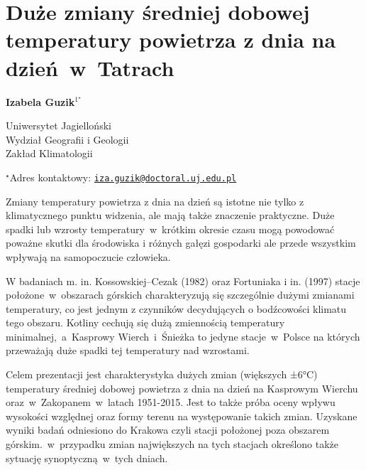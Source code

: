 \documentclass[\main/boa.tex]{subfiles}
\begin{document}
\sloppy


\section{Duże zmiany średniej dobowej  temperatury powietrza z dnia na dzień~w~{Tatrach}}

\begin{center}
  {\bf {} Izabela Guzik$^{1^\star}$}
\end{center}

\vskip 0.3cm

\begin{affiliations}
\begin{enumerate}
\begin{minipage}{0.915\textwidth}
\centering
\item Uniwersytet Jagielloński \\Wydział Geografii i Geologii\\ Zakład Klimatologii \\[-2pt]
\end{minipage}
\end{enumerate}
$^\star$Adres kontaktowy: \href{mailto:iza.guzik@doctoral.uj.edu.pl}{\nolinkurl{iza.guzik@doctoral.uj.edu.pl}}\\
\end{affiliations}

\vskip 0.5cm


\vskip 0.5cm

Zmiany temperatury powietrza z dnia na dzień są istotne nie tylko z klimatycznego punktu widzenia, ale mają także znaczenie praktyczne. Duże spadki lub wzrosty temperatury~w~krótkim okresie czasu mogą powodować poważne skutki dla środowiska i różnych gałęzi gospodarki ale przede wszystkim wpływają na samopoczucie człowieka.

W badaniach m. in. Kossowskiej--Cezak (1982) oraz Fortuniaka i in. (1997) stacje położone~w~obszarach górskich charakteryzują się szczególnie dużymi zmianami temperatury, co jest jednym z czynników decydujących o bodźcowości klimatu tego obszaru. Kotliny cechują się dużą zmiennością temperatury minimalnej,~a~Kasprowy Wierch~i~Śnieżka to jedyne stacje~w~Polsce na których przeważają duże spadki tej temperatury nad wzrostami.

Celem prezentacji jest charakterystyka dużych zmian (większych ±6°C) temperatury średniej dobowej powietrza z dnia na dzień na Kasprowym Wierchu oraz~w~Zakopanem~w~latach 1951-2015. Jest to także próba oceny wpływu wysokości względnej oraz formy terenu na występowanie takich zmian. Uzyskane wyniki badań odniesiono do Krakowa czyli stacji położonej poza obszarem górskim.~w~przypadku zmian największych na tych stacjach określono także sytuację synoptyczną~w~tych dniach.
\end{document}
